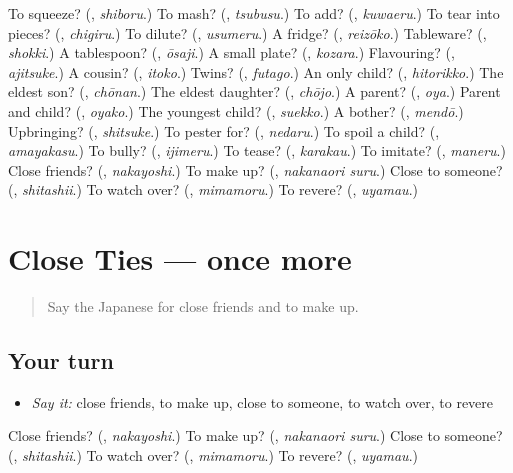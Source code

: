 \begin{tcolorbox}[breakable,colback=teal!4,colframe=teal!35!black,title={Before you move on}]
To squeeze? (\textbf{}, \emph{shiboru}.) To mash? (\textbf{}, \emph{tsubusu}.) To add? (\textbf{}, \emph{kuwaeru}.) To tear into pieces? (\textbf{}, \emph{chigiru}.) To dilute? (\textbf{}, \emph{usumeru}.) A fridge? (\textbf{}, \emph{reizōko}.) Tableware? (\textbf{}, \emph{shokki}.) A tablespoon? (\textbf{}, \emph{ōsaji}.) A small plate? (\textbf{}, \emph{kozara}.) Flavouring? (\textbf{}, \emph{ajitsuke}.) A cousin? (\textbf{}, \emph{itoko}.) Twins? (\textbf{}, \emph{futago}.) An only child? (\textbf{}, \emph{hitorikko}.) The eldest son? (\textbf{}, \emph{chōnan}.) The eldest daughter? (\textbf{}, \emph{chōjo}.) A parent? (\textbf{}, \emph{oya}.) Parent and child? (\textbf{}, \emph{oyako}.) The youngest child? (\textbf{}, \emph{suekko}.) A bother? (\textbf{}, \emph{mendō}.) Upbringing? (\textbf{}, \emph{shitsuke}.) To pester for? (\textbf{}, \emph{nedaru}.) To spoil a child? (\textbf{}, \emph{amayakasu}.) To bully? (\textbf{}, \emph{ijimeru}.) To tease? (\textbf{}, \emph{karakau}.) To imitate? (\textbf{}, \emph{maneru}.) Close friends? (\textbf{}, \emph{nakayoshi}.) To make up? (\textbf{}, \emph{nakanaori suru}.) Close to someone? (\textbf{}, \emph{shitashii}.) To watch over? (\textbf{}, \emph{mimamoru}.) To revere? (\textbf{}, \emph{uyamau}.)
\end{tcolorbox}
\section[(dialogue)]{Close Ties — once more}

\label{lesson:JA-R479-review-final-479}



\begin{quote}
Say the Japanese for close friends and to make up.
\end{quote}

\subsection*{Your turn}
\begin{itemize}
\raggedright
  \item \emph{Say it:} close friends, to make up, close to someone, to watch over, to revere
\end{itemize}

\begin{tcolorbox}[breakable,colback=teal!4,colframe=teal!35!black,title={Before you move on}]
Close friends? (\textbf{}, \emph{nakayoshi}.) To make up? (\textbf{}, \emph{nakanaori suru}.) Close to someone? (\textbf{}, \emph{shitashii}.) To watch over? (\textbf{}, \emph{mimamoru}.) To revere? (\textbf{}, \emph{uyamau}.)
\end{tcolorbox}
